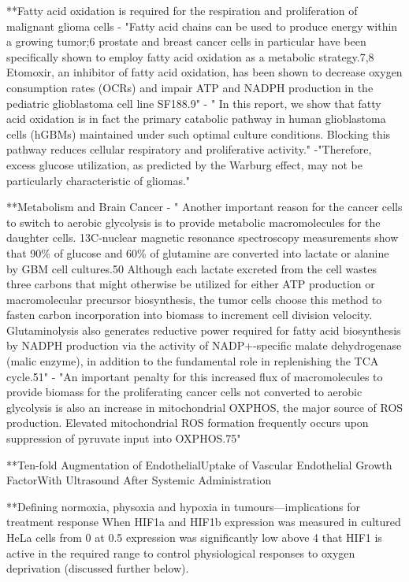 \documentclass[11pt,a4paper]{article}
\begin{document}
**Fatty acid oxidation is required for the respiration and proliferation of malignant glioma cells
- "Fatty acid chains can be used to produce energy within a growing tumor;6 prostate and breast cancer cells in particular have been specifically shown to employ fatty acid oxidation as a metabolic strategy.7,8 Etomoxir, an inhibitor of fatty acid oxidation, has been shown to decrease oxygen consumption rates (OCRs) and impair ATP and NADPH production in the pediatric glioblastoma cell line SF188.9"
- "  In this report, we show that fatty acid oxidation is in fact the primary catabolic pathway in human glioblastoma cells (hGBMs) maintained under such optimal culture conditions. Blocking this pathway reduces cellular respiratory and proliferative activity."
-"Therefore, excess glucose utilization, as predicted by the Warburg effect, may not be particularly characteristic of gliomas."

**Metabolism and Brain Cancer
- " Another important reason for the cancer cells to switch to aerobic glycolysis is to provide metabolic macromolecules for the daughter cells. 13C-nuclear magnetic resonance spectroscopy measurements show that 90\% of glucose and 60\% of glutamine are converted into lactate or alanine by GBM cell cultures.50 Although each lactate excreted from the cell wastes three carbons that might otherwise be utilized for either ATP production or macromolecular precursor biosynthesis, the tumor cells choose this method to fasten carbon incorporation into biomass to increment cell division velocity. Glutaminolysis also generates reductive power required for fatty acid biosynthesis by NADPH production via the activity of NADP+-specific malate dehydrogenase (malic enzyme), in addition to the fundamental role in replenishing the TCA cycle.51"
- "An important penalty for this increased flux of macromolecules to provide biomass for the proliferating cancer cells not converted to aerobic glycolysis is also an increase in mitochondrial OXPHOS, the major source of ROS production. Elevated mitochondrial ROS formation frequently occurs upon suppression of pyruvate input into OXPHOS.75"

**Ten-fold Augmentation of EndothelialUptake of Vascular Endothelial Growth FactorWith Ultrasound After Systemic Administration

**Defining normoxia, physoxia and hypoxia in
tumours—implications for treatment response
When HIF1a and HIF1b expression was measured in cultured
HeLa cells from 0%
at 0.5%
expression was significantly low above 4%
that HIF1 is active in the required range to control physiological
responses to oxygen deprivation (discussed further below).
\end{document}
